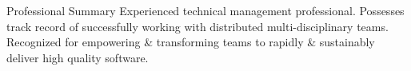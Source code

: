 \documentclass{resume} %
\begin{document}
\vspace{1em}

\begin{rSection}{Professional Summary}
Experienced technical management professional. Possesses track record of successfully working with distributed multi-disciplinary teams. Recognized for empowering \& transforming teams to rapidly \& sustainably deliver high quality software.
\end{rSection}

\end{document}
